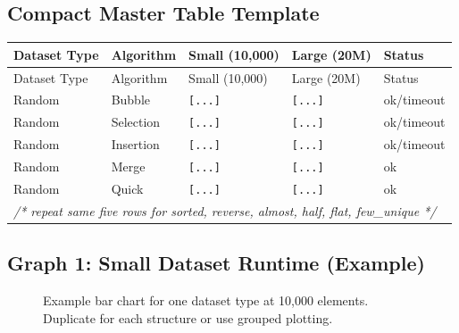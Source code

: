 \documentclass[12pt,a4paper]{article}
\begin{document}
\subsection{Compact Master Table Template}
\begin{longtable}{p{3.2cm}p{2.4cm}p{2.6cm}p{2.0cm}p{2.0cm}}
\toprule
Dataset Type & Algorithm & Small (10,000) & Large (20M) & Status \\
\midrule
\endfirsthead
\toprule
Dataset Type & Algorithm & Small (10,000) & Large (20M) & Status \\
\midrule
\endhead
Random & Bubble & \texttt{[...]} & \texttt{[...]} & ok/timeout \\
Random & Selection & \texttt{[...]} & \texttt{[...]} & ok/timeout \\
Random & Insertion & \texttt{[...]} & \texttt{[...]} & ok/timeout \\
Random & Merge & \texttt{[...]} & \texttt{[...]} & ok \\
Random & Quick & \texttt{[...]} & \texttt{[...]} & ok \\
\multicolumn{5}{l}{\textit{/* repeat same five rows for sorted, reverse, almost, half, flat, few\_unique */}} \\
\bottomrule
\end{longtable}

\subsection{Graph 1: Small Dataset Runtime (Example)}
\begin{figure}[htbp]
\centering
{}
\caption{Example bar chart for one dataset type at 10,000 elements. Duplicate for each structure or use grouped plotting.}
\end{figure}
\end{document}
